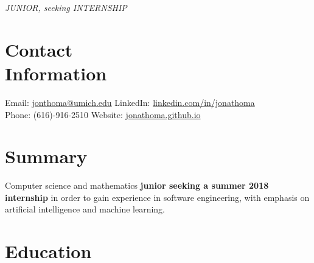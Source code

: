 \documentclass[margin,line]{resume}
\begin{document}
 {\hfill\textsl{\large JUNIOR, seeking INTERNSHIP}}
      
\begin{resume}
    \vspace{-3.5mm}
    \section{\mysidestyle Contact\\Information}
    \noindent Email: \url{jonthoma@umich.edu} \hfill LinkedIn: \url{linkedin.com/in/jonathoma} \\
    \noindent Phone: (616)-916-2510 \hfill Website: \url{jonathoma.github.io} \\ 
    \vspace{-2.5mm}
    
\sectionbreak
\vspace{-2.5mm}
    \section{\mysidestyle Summary}
    Computer science and mathematics \textbf{junior seeking a summer 2018 internship} in order to gain experience in software engineering, with emphasis on artificial intelligence and machine learning. \vspace{-2.5mm}\\ 
    
   \sectionbreak
   \vspace{-2.5mm}
    \section{\mysidestyle Education}


\end{resume}
\end{document}
